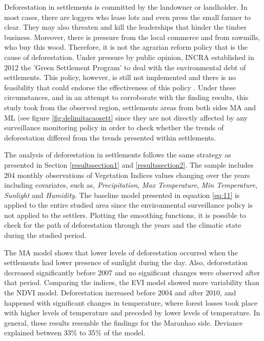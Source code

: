 Deforestation in settlements is committed by the landowner or landholder. In most cases, there are loggers who lease lots and even press the small farmer to clear. They may also threaten and kill the leaderships that hinder the timber business. Moreover, there is pressure from the local commerce and from sawmills, who buy this wood. Therefore, it is not the agrarian reform policy that is the cause of deforestation. Under pressure by public opinion, INCRA established in 2012 the 'Green Settlement Program' to deal with the environmental debt of settlements. This policy, however, is still not implemented and there is no feasibility that could endorse the effectiveness of this policy \citet{PACHECO,PERES2}. Under these circumstances, and in an attempt to corroborate with the finding results, this study took from the observed region, settlements areas from both sides MA and ML (see figure \ref{fig:delimitacaosett} since they are not directly affected by any surveillance monitoring policy in order to check whether the trends of deforestation differed from the trends presented within settlements.

The analysis of deforestation in settlements follows the same strategy as presented in Section \ref{resultssection1} and \ref{resultssection2}. The sample includes 204 monthly observations of Vegetation Indices values changing over the years including covariates, such as, \textit{Precipitation}, \textit{Max Temperature}, \textit{Min Temperature}, \textit{Sunlight} and \textit{Humidity}. The baseline model presented in equation \ref{eq:11} is applied to the entire studied area since the environmental surveillance policy is not applied to the settlers. Plotting the smoothing functions, it is possible to check for the path of deforestation through the years and the  climatic  state  during  the studied period. 

The MA model shows that lower levels of deforestation occurred when the settlements had lower presence of sunlight during the day. Also, deforestation decreased significantly before 2007 and no significant changes were observed after that period. Comparing the indices, the EVI model showed more variability than the NDVI model. Deforestation increased before 2004 and after 2010, and happened with significant changes in temperature, where forest losses took place with higher levels of temperature and preceded by lower levels of temperature. In general, these results resemble the findings for the Maranhao side. Deviance explained between 33$\%$ to 35$\%$ of the model.

